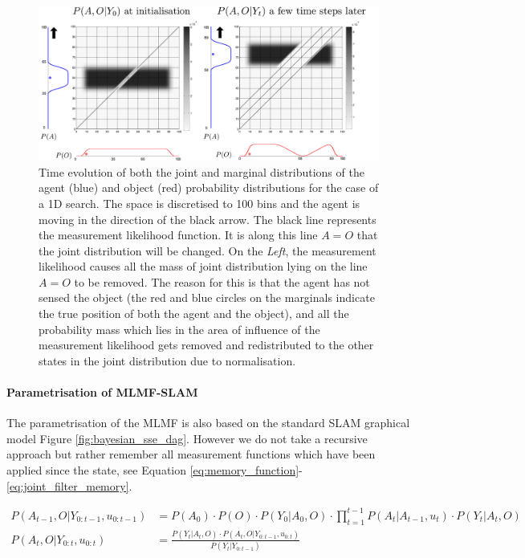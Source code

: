 \begin{figure}
 \centering
 \includegraphics[width=\textwidth]{./ch5-MLMF/Figures/Figure6.pdf}
 \caption{Time evolution of both the joint and marginal distributions of the agent (blue) and object (red) probability distributions for 
 the case of a 1D search. The space is discretised to 100 bins and the agent is moving in the direction of the black arrow. 
 The black line represents the measurement likelihood function. It is along this line $A=O$ that the joint distribution will be
 changed. On the \textit{Left}, the measurement likelihood causes all the mass of joint distribution
 lying on the line $A=O$ to be removed. 
 The reason for this is that the agent has not sensed the object (the red and blue circles on the marginals indicate the true position of
 both the agent and the object), and all the probability mass which lies in the area of influence of the measurement likelihood gets 
 removed and redistributed to the other states in the joint distribution due to normalisation.}
 \label{fig:margina_joint_example}
\end{figure}

\paragraph{Parametrisation of MLMF-SLAM}

The parametrisation of the MLMF is also based on the standard SLAM graphical model Figure \ref{fig:bayesian_sse_dag}. However
we do not take a recursive approach but rather remember all measurement functions which have been applied since 
the state, see Equation \ref{eq:memory_function}-\ref{eq:joint_filter_memory}.

\begin{align} 
 P(A_{t-1},O|Y_{0:t-1},u_{0:t-1}) &= P(A_0) \cdot P(O)  \cdot  P(Y_0|A_0,O) \cdot \prod\limits_{t=1}^{t-1} P(A_t|A_{t-1},u_t) \cdot P(Y_t|A_t,O) \label{eq:memory_function} \\
 P(A_t,O|Y_{0:t},u_{0:t})         &= \frac{P(Y_t|A_t,O) \cdot  P(A_t,O|Y_{0:t-1},u_{0:t})  }{  P(Y_t|Y_{0:t-1}) } \label{eq:joint_filter_memory}
\end{align}

